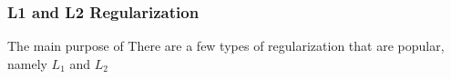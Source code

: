 \subsubsection{L1 and L2 Regularization}

The main purpose of There are a few types of regularization that are popular, namely $L_1$ and $L_2$